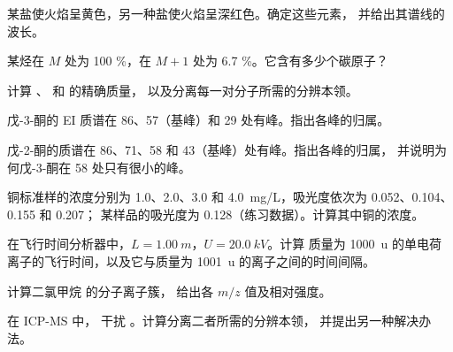 \begin{exercise}[$\star$]\label{exo:b2:mass-spec-atomic:4}
某盐使火焰呈黄色，另一种盐使火焰呈深红色。确定这些元素，
并给出其谱线的波长。
\end{exercise}

\begin{exercise}[$\star\star$]\label{exo:b2:mass-spec-atomic:5}
某烃在 $M$ 处为 100 \%，在 $M+1$ 处为 6.7 \%。它含有多少个碳原子？
\end{exercise}

\begin{exercise}[$\star\star$]\label{exo:b2:mass-spec-atomic:6}
计算 、 和  的精确质量，
以及分离每一对分子所需的分辨本领。
\end{exercise}

\begin{exercise}[$\star\star$]\label{exo:b2:mass-spec-atomic:7}
戊-3-酮的 EI 质谱在 86、57（基峰）和 29 处有峰。指出各峰的归属。
\end{exercise}

\begin{exercise}[$\star\star$]\label{exo:b2:mass-spec-atomic:8}
戊-2-酮的质谱在 86、71、58 和 43（基峰）处有峰。指出各峰的归属，
并说明为何戊-3-酮在 58 处只有很小的峰。
\end{exercise}

\begin{exercise}[$\star\star$]\label{exo:b2:mass-spec-atomic:9}
铜标准样的浓度分别为 1.0、2.0、3.0 和 \qty{4.0}{mg/L}，吸光度依次为 0.052、0.104、0.155 和 0.207；
某样品的吸光度为 0.128（练习数据）。计算其中铜的浓度。
\end{exercise}

\begin{exercise}[$\star\star\star$]\label{exo:b2:mass-spec-atomic:10}
在飞行时间分析器中，$L = \qty{1.00}{m}$，$U = \qty{20.0}{kV}$。计算
质量为 \qty{1000}{u} 的单电荷离子的飞行时间，以及它与质量为 \qty{1001}{u} 的离子之间的时间间隔。
\end{exercise}

\begin{exercise}[$\star\star\star$]\label{exo:b2:mass-spec-atomic:11}
计算二氯甲烷  的分子离子簇，
给出各 $m/z$ 值及相对强度。
\end{exercise}

\begin{exercise}[$\star\star\star$]\label{exo:b2:mass-spec-atomic:12}
在 ICP-MS 中， 干扰 。计算分离二者所需的分辨本领，
并提出另一种解决办法。
\end{exercise}

